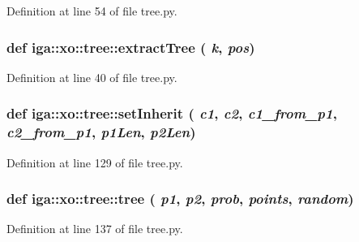 Definition at line 54 of file tree.py.
\subsubsection{\setlength{\rightskip}{0pt plus 5cm}def iga::xo::tree::extractTree ( {\em k},  {\em pos})}\label{namespaceiga_1_1xo_1_1tree_4bf999f44f8ab879ba934d6d3b7db701}




Definition at line 40 of file tree.py.
\subsubsection{\setlength{\rightskip}{0pt plus 5cm}def iga::xo::tree::setInherit ( {\em c1},  {\em c2},  {\em c1\_\-from\_\-p1},  {\em c2\_\-from\_\-p1},  {\em p1Len},  {\em p2Len})}\label{namespaceiga_1_1xo_1_1tree_c19f10131e6d551f3c685de0a22cc186}




Definition at line 129 of file tree.py.
\subsubsection{\setlength{\rightskip}{0pt plus 5cm}def iga::xo::tree::tree ( {\em p1},  {\em p2},  {\em prob},  {\em points},  {\em random})}\label{namespaceiga_1_1xo_1_1tree_1f33829a7fbd0bf811ac572cc6291967}




Definition at line 137 of file tree.py.